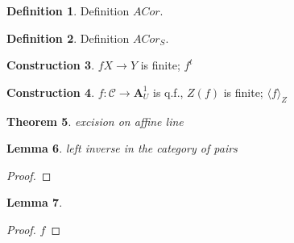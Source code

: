 \documentclass[a4paper, oneside, english,reqno]{amsart}
\theoremstyle{plain}
\newtheorem{theorem}{Theorem}[section]
\newtheorem{lemma}[theorem]{Lemma}
\theoremstyle{definition}
\newtheorem{definition}[theorem]{Definition}
\newtheorem{construction}[theorem]{Construction}
\theoremstyle{remark}
\newcommand{\A}{\mathbf{A}}
\begin{document}
\begin{definition}
Definition $ACor$.
\end{definition}

\begin{definition}
Definition $ACor_S$.
\end{definition}


\begin{construction}\label{con:transposeCor}
$f X\to Y$ is finite; $f^t$
\end{construction}

\begin{construction}\label{con:CorRelCurve}
$f\colon \mathcal C\to \A^1_U$ is q.f., $Z(f)$ is finite;
$\langle f\rangle_Z$
\end{construction}


\begin{theorem}
excision on affine line
\end{theorem}
\begin{lemma}
left inverse in the category of pairs
\end{lemma}
\begin{proof}

\end{proof}
\begin{lemma}

\end{lemma}
\begin{proof}
$f$
\end{proof}








\printbibliography
\end{document}
